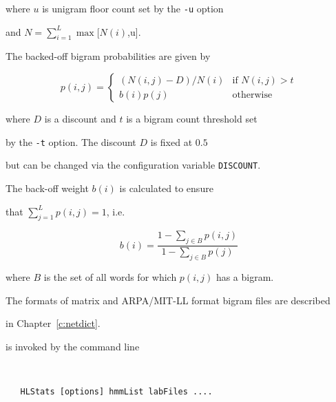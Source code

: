 where $u$ is unigram floor count set by the \texttt{-u} option


and $N = \sum_{i=1}^L \max [N(i)$,u].





The backed-off bigram probabilities are given by


\[


   p(i,j) = \left\{


      \begin{array}{ll}


           (N(i,j) - D )/N(i) & \mbox{if $N(i,j) > t$} \\


                  b(i) p(j)  & \mbox{otherwise}


       \end{array}


   \right. 


\]


where $D$ is a discount and $t$ is a bigram count threshold set


by the \texttt{-t} option.  The discount $D$ is fixed at $0.5$ 


but can be changed via the configuration variable \texttt{DISCOUNT}.


The back-off weight $b(i)$ is calculated to ensure 


that $\sum_{j=1}^L p(i,j) = 1$, i.e.


\[


  b(i) = \frac{1 - \sum_{j \in B} p(i,j)}{1 - \sum_{j \in B} p(j)}


\]


where $B$ is the set of all words for which $p(i,j)$ has a bigram.





The formats of matrix and ARPA/MIT-LL format bigram files are described


in Chapter~\ref{c:netdict}.










 is invoked by the command line


\begin{verbatim}


   HLStats [options] hmmList labFiles ....


\end{verbatim}


